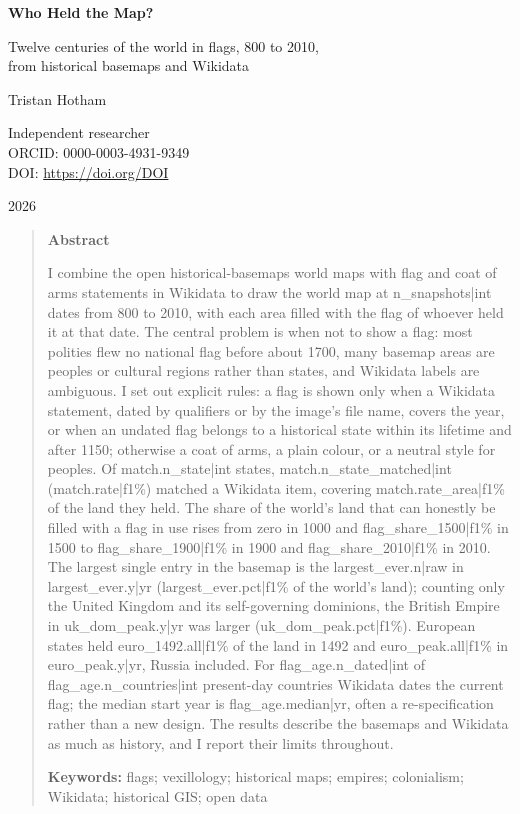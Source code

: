 \documentclass[11pt,a4paper]{article}
\begin{document}
\begin{center}
{\Large\bfseries Who Held the Map?\par}
\vspace{0.4em}
{\large Twelve centuries of the world in flags, 800 to 2010,\\from historical basemaps and Wikidata\par}
\vspace{1.2em}
{\large Tristan Hotham\par}
\vspace{0.3em}
{\small Independent researcher\\
ORCID: 0000-0003-4931-9349\\
DOI: \href{https://doi.org/{{DOI}}}{https://doi.org/{{DOI}}}\par}
\vspace{0.8em}
2026
\end{center}

\begin{quote}
\small
\begin{center}\textbf{Abstract}\end{center}
I combine the open historical-basemaps world maps \citep{ourednik} with flag and coat of arms statements in Wikidata to draw the world map at {{n_snapshots|int}} dates from 800 to 2010, with each area filled with the flag of whoever held it at that date. The central problem is when not to show a flag: most polities flew no national flag before about 1700, many basemap areas are peoples or cultural regions rather than states, and Wikidata labels are ambiguous. I set out explicit rules: a flag is shown only when a Wikidata statement, dated by qualifiers or by the image's file name, covers the year, or when an undated flag belongs to a historical state within its lifetime and after 1150; otherwise a coat of arms, a plain colour, or a neutral style for peoples. Of {{match.n_state|int}} states, {{match.n_state_matched|int}} ({{match.rate|f1}}\%) matched a Wikidata item, covering {{match.rate_area|f1}}\% of the land they held. The share of the world's land that can honestly be filled with a flag in use rises from zero in 1000 and {{flag_share_1500|f1}}\% in 1500 to {{flag_share_1900|f1}}\% in 1900 and {{flag_share_2010|f1}}\% in 2010. The largest single entry in the basemap is the {{largest_ever.n|raw}} in {{largest_ever.y|yr}} ({{largest_ever.pct|f1}}\% of the world's land); counting only the United Kingdom and its self-governing dominions, the British Empire in {{uk_dom_peak.y|yr}} was larger ({{uk_dom_peak.pct|f1}}\%). European states held {{euro_1492.all|f1}}\% of the land in 1492 and {{euro_peak.all|f1}}\% in {{euro_peak.y|yr}}, Russia included. For {{flag_age.n_dated|int}} of {{flag_age.n_countries|int}} present-day countries Wikidata dates the current flag; the median start year is {{flag_age.median|yr}}, often a re-specification rather than a new design. The results describe the basemaps and Wikidata as much as history, and I report their limits throughout.

\textbf{Keywords:} flags; vexillology; historical maps; empires; colonialism; Wikidata; historical GIS; open data
\end{quote}
\end{document}
